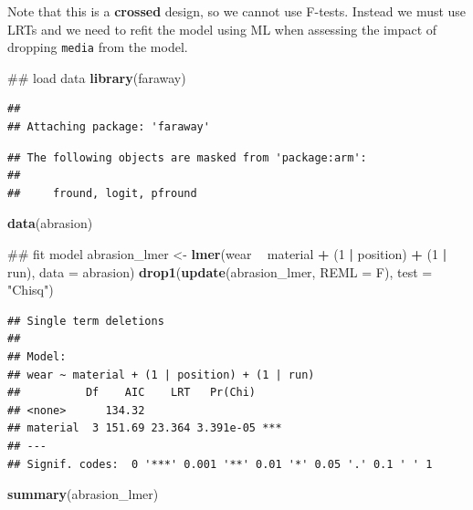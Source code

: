 \documentclass[]{book}
\newenvironment{Shaded}{\begin{snugshade}}{\end{snugshade}}
\newcommand{\KeywordTok}[1]{\textcolor[rgb]{0.13,0.29,0.53}{\textbf{#1}}}
\newcommand{\DataTypeTok}[1]{\textcolor[rgb]{0.13,0.29,0.53}{#1}}
\newcommand{\DecValTok}[1]{\textcolor[rgb]{0.00,0.00,0.81}{#1}}
\newcommand{\StringTok}[1]{\textcolor[rgb]{0.31,0.60,0.02}{#1}}
\newcommand{\OperatorTok}[1]{\textcolor[rgb]{0.81,0.36,0.00}{\textbf{#1}}}
\newcommand{\NormalTok}[1]{#1}
\theoremstyle{definition}
\theoremstyle{definition}
\theoremstyle{definition}
\theoremstyle{remark}
\begin{document}
Note that this is a \textbf{crossed} design, so we cannot use F-tests.
Instead we must use LRTs and we need to refit the model using ML when
assessing the impact of dropping \texttt{media} from the model.

\begin{Shaded}
\begin{Highlighting}[]
\NormalTok{## load data}
\KeywordTok{library}\NormalTok{(faraway)}
\end{Highlighting}
\end{Shaded}

\begin{verbatim}
## 
## Attaching package: 'faraway'
\end{verbatim}

\begin{verbatim}
## The following objects are masked from 'package:arm':
## 
##     fround, logit, pfround
\end{verbatim}

\begin{Shaded}
\begin{Highlighting}[]
\KeywordTok{data}\NormalTok{(abrasion)}

\NormalTok{## fit model}
\NormalTok{abrasion_lmer <-}\StringTok{ }\KeywordTok{lmer}\NormalTok{(wear }\OperatorTok{~}\StringTok{ }\NormalTok{material }\OperatorTok{+}\StringTok{ }\NormalTok{(}\DecValTok{1} \OperatorTok{|}\StringTok{ }\NormalTok{position) }\OperatorTok{+}\StringTok{ }\NormalTok{(}\DecValTok{1} \OperatorTok{|}\StringTok{ }\NormalTok{run), }\DataTypeTok{data =}\NormalTok{ abrasion)}
\KeywordTok{drop1}\NormalTok{(}\KeywordTok{update}\NormalTok{(abrasion_lmer, }\DataTypeTok{REML =}\NormalTok{ F), }\DataTypeTok{test =} \StringTok{"Chisq"}\NormalTok{)}
\end{Highlighting}
\end{Shaded}

\begin{verbatim}
## Single term deletions
## 
## Model:
## wear ~ material + (1 | position) + (1 | run)
##          Df    AIC    LRT   Pr(Chi)    
## <none>      134.32                     
## material  3 151.69 23.364 3.391e-05 ***
## ---
## Signif. codes:  0 '***' 0.001 '**' 0.01 '*' 0.05 '.' 0.1 ' ' 1
\end{verbatim}

\begin{Shaded}
\begin{Highlighting}[]
\KeywordTok{summary}\NormalTok{(abrasion_lmer)}
\end{Highlighting}
\end{Shaded}
\end{document}
